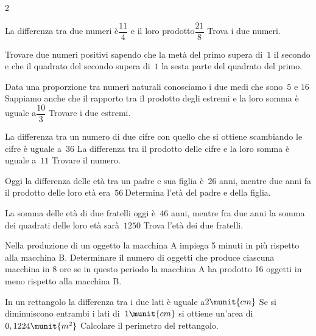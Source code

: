 \begin{htmulticols}{2}
\begin{esercizio}[*]
\label{ese:6.49}
La differenza tra due numeri è\(\dfrac {11} 4\) e il loro 
prodotto\(\dfrac 
{21} 8\) 
Trova i due numeri.
\end{esercizio}

\begin{esercizio}[*]
\label{ese:6.50}
Trovare due numeri positivi sapendo che la metà del primo supera di~\(1\) 
il 
secondo e che il quadrato del secondo supera di~\(1\) la sesta parte del 
quadrato del primo.
\end{esercizio}

\begin{esercizio}[*]
\label{ese:6.51}
Data una proporzione tra numeri naturali conosciamo i due medi che 
sono~\(5\) e 
\( 16\) Sappiamo anche che il rapporto tra il prodotto degli estremi e la 
loro 
somma è uguale a\(\dfrac {10} 3\) Trovare i due estremi.
\end{esercizio}

\begin{esercizio}[*]
\label{ese:6.52}
La differenza tra un numero di due cifre con quello che si ottiene 
scambiando le 
cifre è uguale a~\(36\) La differenza tra il prodotto delle cifre e la 
loro 
somma è uguale a~\(11\) Trovare il numero.
\end{esercizio}

\begin{esercizio}[*]
\label{ese:6.53}
Oggi la differenza delle età tra un padre e sua figlia è~\(26\) anni, 
mentre 
due 
anni fa il prodotto delle loro età era~\(56~\)Determina l'età del padre e 
della 
figlia.
\end{esercizio}

\begin{esercizio}[*]
\label{ese:6.54}
La somma delle età di due fratelli oggi è~\(46\) anni, mentre fra due 
anni 
la 
somma dei quadrati delle loro età sarà~\(1250\) Trova l'età dei due 
fratelli.
\end{esercizio}

\begin{esercizio}[*]
\label{ese:6.55}
Nella produzione di un oggetto la macchina A impiega 5 minuti in più 
rispetto 
alla macchina B. Determinare il numero di oggetti che produce ciascuna 
macchina 
in 8 ore se in questo periodo la macchina A ha prodotto 16 oggetti in 
meno 
rispetto alla macchina B.
\end{esercizio}

\begin{esercizio}[*]
\label{ese:6.56}
In un rettangolo la differenza tra i due lati è uguale a\(2\munit{cm}\) Se 
si 
diminuiscono entrambi i lati di~\(1\munit{cm}\) si ottiene un'area di 
\(0,1224\munit{m^2}~\)Calcolare il perimetro del rettangolo.
\end{esercizio}


\end{htmulticols}
